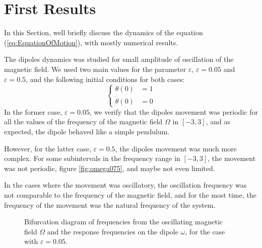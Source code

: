 \section{First Results}

In this Section, we\textquotesingle ll briefly discuss the dynamics of the equation (\ref{eq:EquationOfMotion}), with mostly numerical results. 

The dipole\textquotesingle s dynamics was studied for small amplitude of oscillation of the magnetic field. We used two main values for the parameter $\varepsilon$, $\varepsilon = 0.05$ and $\varepsilon = 0.5$, and the following initial conditions for both cases:
\begin{equation}
    \begin{cases}
        \theta (0) &= 1\\        
        \dot{\theta}(0) &= 0
    \end{cases}
\end{equation} 
In the former case, $\varepsilon = 0.05$, we verify that the dipole\textquotesingle s movement was periodic for all the values of the frequency of the magnetic field $\Omega$ in $[-3,3]$, and as expected, the dipole behaved like a simple pendulum. 

However, for the latter case, $\varepsilon = 0.5$, the dipole\textquotesingle s movement was much more complex. For some subintervals in the frequency range in $[-3,3]$, the movement was not periodic, figure \ref{fig:omega075}, and maybe not even limited. 

In the cases where the movement was oscillatory, the oscillation frequency was not comparable to the frequency of the magnetic field, and for the most time, the frequency of the movement was the natural frequency of the system. 

\begin{figure}
    \centering
    \scalebox{0.7}{}
    \caption{Bifurcation diagram of frequencies from the oscillating magnetic field $\Omega$ and the response frequencies on the dipole $\omega$, for the case with $\varepsilon = 0.05$.}
    \label{fig:bif005}
\end{figure}

